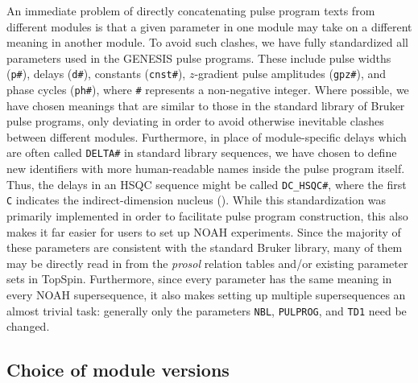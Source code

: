 \documentclass[a4paper,11pt]{article}
\newcommand{\carbon}{\ch{^{13}C}}
\begin{document}
\begin{refsection}
An immediate problem of directly concatenating pulse program texts from different modules is that a given parameter in one module may take on a different meaning in another module.
To avoid such clashes, we have fully standardized all parameters used in the GENESIS pulse programs.
These include pulse widths (\texttt{p\#}), delays (\texttt{d\#}), constants (\texttt{cnst\#}), \(z\)-gradient pulse amplitudes (\texttt{gpz\#}), and phase cycles (\texttt{ph\#}), where \texttt{\#} represents a non-negative integer.
Where possible, we have chosen meanings that are similar to those in the standard library of Bruker pulse programs, only deviating in order to avoid otherwise inevitable clashes between different modules.
Furthermore, in place of module-specific delays which are often called \texttt{DELTA\#} in standard library sequences, we have chosen to define new identifiers with more human-readable names inside the pulse program itself.
Thus, the delays in an HSQC sequence might be called \texttt{DC\_HSQC\#}, where the first \texttt{C} indicates the indirect-dimension nucleus (\carbon{}).
While this standardization was primarily implemented in order to facilitate pulse program construction, this also makes it far easier for users to set up NOAH experiments.
Since the majority of these parameters are consistent with the standard Bruker library, many of them may be directly read in from the \textit{prosol} relation tables and/or existing parameter sets in TopSpin.
Furthermore, since every parameter has the same meaning in every NOAH supersequence, it also makes setting up multiple supersequences an almost trivial task: generally only the parameters \texttt{NBL}, \texttt{PULPROG}, and \texttt{TD1} need be changed.


\subsection{Choice of module versions}


\end{refsection}
\end{document}
